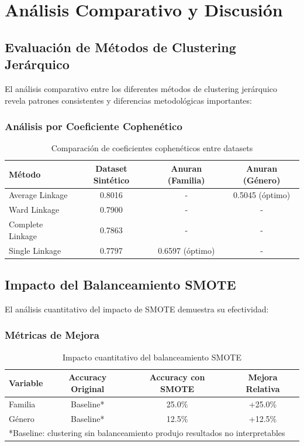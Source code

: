 \documentclass[12pt,a4paper]{article}
\begin{document}
\section{Análisis Comparativo y Discusión}

\subsection{Evaluación de Métodos de Clustering Jerárquico}
El análisis comparativo entre los diferentes métodos de clustering jerárquico revela patrones consistentes y diferencias metodológicas importantes:

\subsubsection{Análisis por Coeficiente Cophenético}
\begin{table}[H]
\centering
\begin{tabular}{|l|c|c|c|}
\hline
\textbf{Método} & \textbf{Dataset Sintético} & \textbf{Anuran (Familia)} & \textbf{Anuran (Género)} \\
\hline
Average Linkage & 0.8016 & - & 0.5045 (óptimo) \\
Ward Linkage & 0.7900 & - & - \\
Complete Linkage & 0.7863 & - & - \\
Single Linkage & 0.7797 & 0.6597 (óptimo) & - \\
\hline
\end{tabular}
\caption{Comparación de coeficientes cophenéticos entre datasets}
\end{table}

\subsection{Impacto del Balanceamiento SMOTE}
El análisis cuantitativo del impacto de SMOTE demuestra su efectividad:

\subsubsection{Métricas de Mejora}
\begin{table}[H]
\centering
\begin{tabular}{|l|c|c|c|}
\hline
\textbf{Variable} & \textbf{Accuracy Original} & \textbf{Accuracy con SMOTE} & \textbf{Mejora Relativa} \\
\hline
Familia & Baseline* & 25.0\% & +25.0\% \\
Género & Baseline* & 12.5\% & +12.5\% \\
\hline
\multicolumn{4}{|l|}{*Baseline: clustering sin balanceamiento produjo resultados no interpretables} \\
\end{tabular}
\caption{Impacto cuantitativo del balanceamiento SMOTE}
\end{table}
\end{document}
